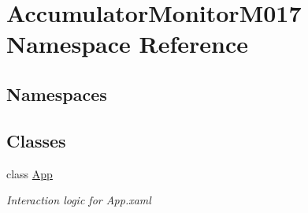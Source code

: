 \hypertarget{namespace_accumulator_monitor_m017}{}\section{Accumulator\+Monitor\+M017 Namespace Reference}
\label{namespace_accumulator_monitor_m017}
\subsection*{Namespaces}
\begin{DoxyCompactItemize}
\end{DoxyCompactItemize}
\subsection*{Classes}
\begin{DoxyCompactItemize}
\item 
class \hyperlink{class_accumulator_monitor_m017_1_1_app}{App}
\begin{DoxyCompactList}\small\item\em Interaction logic for App.\+xaml \end{DoxyCompactList}\end{DoxyCompactItemize}
